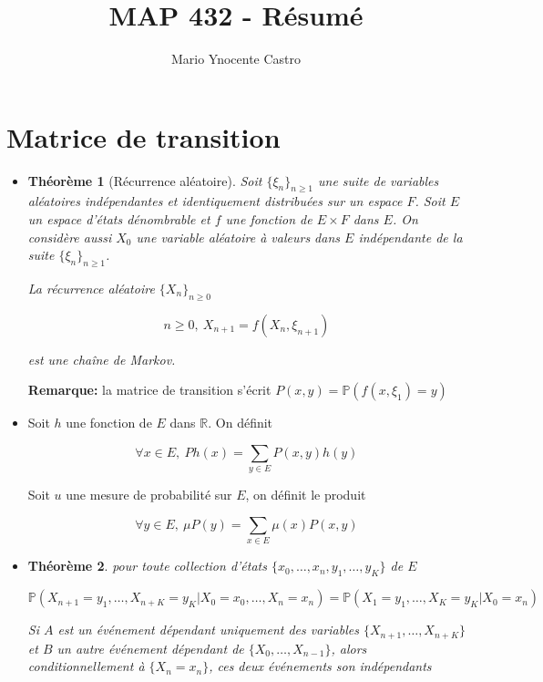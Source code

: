 \documentclass[10pt,a4paper,oneside]{article}
\newtheorem{theoreme}{Théorème}
\begin{document}
\title{MAP 432 - Résumé}
\author{Mario Ynocente Castro}

\maketitle

\section{Matrice de transition}

\begin{itemize}

\item
\begin{theoreme}[Récurrence aléatoire]
Soit $\{ \xi_n \}_{n \geq 1}$ une suite de variables aléatoires indépendantes et identiquement distribuées sur un espace $F$. Soit $E$ un espace d'états dénombrable et $f$ une fonction de $E \times F$ dans $E$. On considère aussi $X_0$ une variable aléatoire à valeurs dans $E$ indépendante de la suite $\{ \xi_n \}_{n \geq 1}$.

La récurrence aléatoire $\{ X_n \}_{n \geq 0}$

\[ n \geq 0,\ X_{n + 1} = f(X_n,\xi_{n + 1}) \]

est une chaîne de Markov.
\end{theoreme}

\textbf{Remarque:} la matrice de transition s'écrit $\boxed{ P(x,y) = \mathbb{P}(f(x,\xi_1) = y) }$

\item
Soit $h$ une fonction de $E$ dans $\mathbb{R}$. On définit

\[ \forall x \in E,\ Ph(x) = \sum_{y \in E}P(x,y) h(y) \]

Soit $u$ une mesure de probabilité sur $E$, on définit le produit

\[ \forall y \in E,\ \mu P(y) = \sum_{x \in E} \mu(x) P(x,y) \]

\item
\begin{theoreme}
pour toute collection d'états $\{ x_0,\ldots,x_n,y_1,\ldots,y_K \}$ de $E$

\[ \boxed{ \mathbb{P}(X_{n + 1} = y_1,\ldots,X_{n + K} = y_K | X_0 = x_0,\ldots,X_n = x_n) = \mathbb{P}(X_1 = y_1,\ldots,X_K = y_K | X_0 = x_n) } \]

Si $A$ est un événement dépendant uniquement des variables $\{ X_{n + 1},\ldots,X_{n + K} \}$ et $B$ un autre événement dépendant de $\{ X_0,\ldots,X_{n - 1} \}$, alors conditionnellement à $\{ X_n = x_n \}$, ces deux événements son indépendants


\end{theoreme}
\end{itemize}
\end{document}
